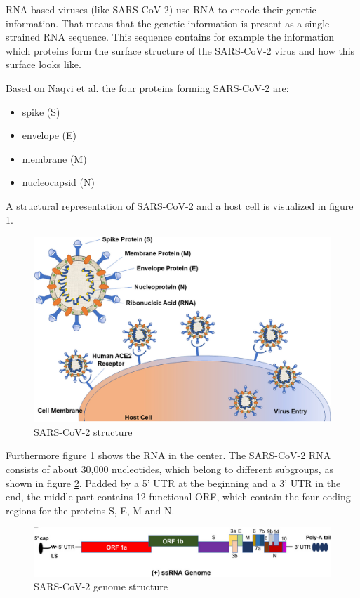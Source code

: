 \ac{RNA} based viruses (like \ac{SARS-CoV-2}) use \ac{RNA} to encode their genetic information. That means that the genetic information is present as a single strained \ac{RNA} sequence. This sequence contains for example the information which proteins form the surface structure of the SARS-CoV-2 virus and how this surface looks like. \cite{NAQVI2020165878}

Based on Naqvi et al. \cite{NAQVI2020165878} the four proteins forming \ac{SARS-CoV-2} are:
\begin{itemize}
	\item spike (S)
	\item envelope (E)
	\item membrane (M)
	\item nucleocapsid (N)
\end{itemize}

A structural representation of \ac{SARS-CoV-2} and a host cell is visualized in figure \ref{sarscov2_structure}. \cite{NAQVI2020165878}

\begin{figure}[ht]
	\centering
	\includegraphics[width=0.8\linewidth]{figures/SARS-CoV-2Structure.jpg}
	\caption{SARS-CoV-2 structure \cite{NAQVI2020165878}}
	\label{sarscov2_structure}
\end{figure}

Furthermore figure \ref{sarscov2_structure} shows the \ac{RNA} in the center. The \ac{SARS-CoV-2} \ac{RNA} consists of about 30,000 nucleotides, which belong to different subgroups, as shown in figure \ref{sarscov2GenomeStructure}. 
Padded by a 5' \ac{UTR} at the beginning and a 3' \ac{UTR} in the end, the middle part contains 12 functional \ac{ORF}, which contain the four coding regions for the proteins S, E, M and N. 

\begin{figure}[ht]
	\centering
	\includegraphics[width=1.0\linewidth]{figures/sarscov2GenomeStructure.png}
	\caption{SARS-CoV-2 genome structure \cite{NAQVI2020165878}}
	\label{sarscov2GenomeStructure}
\end{figure}


